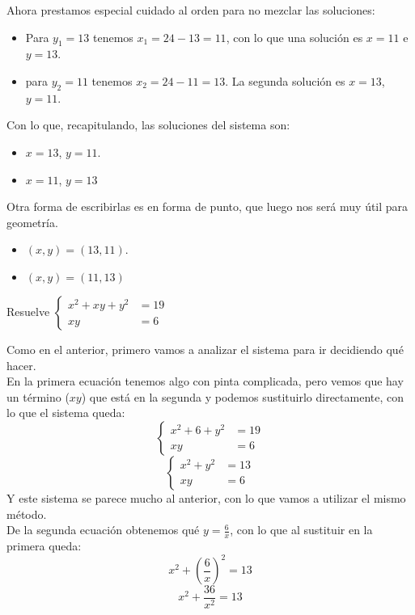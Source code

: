 \documentclass[a4paper,11pt,answers]{exam}
\begin{document}
\begin{questions}
\begin{solution}
      Ahora prestamos especial cuidado al orden para no mezclar las soluciones:
      \begin{itemize}
      \item Para $y_1 = 13$ tenemos $x_1 = 24 - 13= 11$, con lo que una solución es $x = 11$ e
        $y=13$.
      \item para $y_2 = 11$ tenemos $x_2 = 24 - 11 = 13$. La segunda solución es $x = 13$, $y = 11$.
      \end{itemize}
      Con lo que, recapitulando, las soluciones del sistema son:
      \begin{itemize}
      \item $x=13$, $y=11$.
      \item $x=11$, $y=13$
      \end{itemize}
      Otra forma de escribirlas es en forma de punto, que luego nos será muy útil para geometría.
      \begin{itemize}
      \item $(x,y)=(13, 11)$.
      \item $(x,y)=(11, 13)$
      \end{itemize}
    \end{solution}
  \question Resuelve $
    \begin{cases}
      x^2 + xy + y^2 &= 19\\
      xy &= 6
    \end{cases}$
    \begin{solution}
      Como en el anterior, primero vamos a analizar el sistema para ir decidiendo qué hacer.\\
      En la primera ecuación tenemos algo con pinta complicada, pero vemos que hay un término
      ($xy$) que está en la segunda y podemos sustituirlo directamente, con lo que el sistema queda:
      \[
        \begin{cases}
          x^2 + 6 + y^2 &=19\\
          xy &=6
        \end{cases}\]
      \[
        \begin{cases}
          x^2 + y^2 &=13\\
          xy &=6
        \end{cases}\]
      Y este sistema se parece mucho al anterior, con lo que vamos a utilizar el mismo método.\\
      De la segunda ecuación obtenemos qué $y = \frac{6}{x}$, con lo que al sustituir en la primera
      queda:
      \[x^2 + \left(\frac{6}{x}\right)^2 = 13\]
      \[x^2 + \frac{36}{x^2} = 13\]

\end{solution}
\end{questions}
\end{document}
